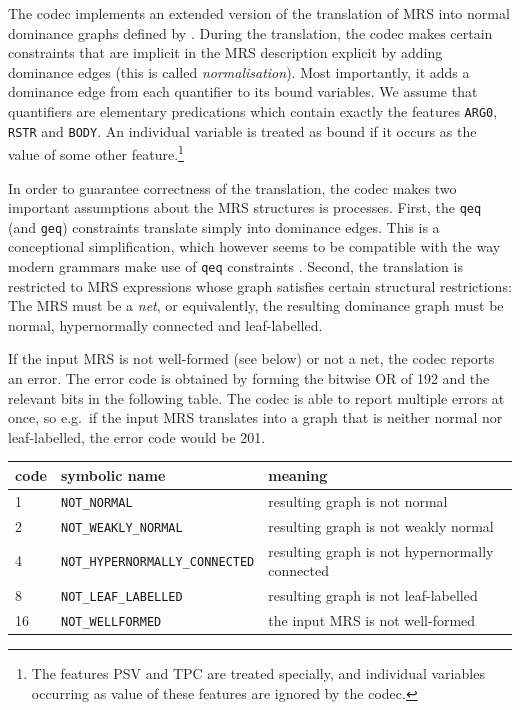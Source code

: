 The codec implements an extended version of the translation of MRS
into normal dominance graphs defined by . During the
translation, the codec makes certain constraints that are implicit in
the MRS description explicit by adding dominance edges (this is called \emph{normalisation}). Most
importantly, it adds a dominance edge from each quantifier to its
bound variables. We assume that quantifiers are elementary
predications which contain exactly the features \verb|ARG0|,
\verb|RSTR| and \verb|BODY|. An individual variable is treated as
bound if it occurs as the value of some other feature.\footnote{The
  features PSV and TPC are treated specially, and individual variables
  occurring as value of these features are ignored by the codec.}

In order to guarantee correctness of the translation, the codec makes
two important assumptions about the MRS structures is processes.
First, the \verb|qeq| (and \verb|geq|) constraints translate simply
into dominance edges. This is a conceptional simplification, which
however seems to be compatible with the way modern grammars make use
of \verb|qeq| constraints \cite{FucKolNieTha04}. Second, the
translation is restricted to MRS expressions whose graph satisfies
certain structural restrictions: The MRS must be a \emph{net}, or
equivalently, the resulting dominance graph must be normal,
hypernormally connected and leaf-labelled.

If the input MRS is not well-formed (see below) or not a net, the
codec reports an error. The error code is obtained by forming the
bitwise OR of 192 and the relevant bits in the following table. The
codec is able to report multiple errors at once, so e.g.\ if the input
MRS translates into a graph that is neither normal nor leaf-labelled,
the error code would be 201.

\begin{tabular}{lll}
code & symbolic name & meaning \\ \hline
1 &  \verb?NOT_NORMAL? & resulting graph is not normal \\
2 &  \verb?NOT_WEAKLY_NORMAL? & resulting graph is not weakly normal \\
4 &  \verb?NOT_HYPERNORMALLY_CONNECTED? & resulting graph is not hypernormally connected \\
8 &  \verb?NOT_LEAF_LABELLED? & resulting graph is not leaf-labelled \\
16 &  \verb?NOT_WELLFORMED? & the input MRS is not well-formed 
\end{tabular}

